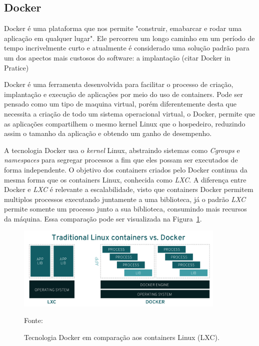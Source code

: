 \subsection{Docker}

Docker é uma plataforma que nos permite "construir, emabarcar e rodar uma aplicação em qualquer lugar". Ele percorreu um longo caminho em um período de tempo incrivelmente curto e atualmente é considerado uma solução padrão para um dos apectos mais custosos do software: a implantação (citar Docker in Pratice)

Docker é uma ferramenta desenvolvida para facilitar o processo de criação, implantação e execução de aplicações por meio do uso de containers.
%
Pode ser pensado como um tipo de maquina virtual, porém diferentemente desta que necessita a criação de todo um sistema operacional virtual, o Docker, permite que as aplicações compartilhem o mesmo kernel Linux que o hospedeiro, reduzindo assim o tamanho da aplicação e obtendo um ganho de desempenho.


A tecnologia Docker usa o \textit{kernel} Linux, abstraindo sistemas como \textit{Cgroups} e \textit{namespaces} para segregar processos a fim que eles possam ser executados de forma independente.
%
O objetivo dos containers criados pelo Docker continua da mesma forma que  os containers Linux, conhecida como \textit{LXC}.
%
A diferença entre Docker e \textit{LXC} é relevante a escalabilidade, visto que containers Docker permitem multiplos processos executando juntamente a uma biblioteca, já o padrão \textit{LXC} permite somente um processo junto a sua biblioteca, consumindo mais recursos da máquina.
%
Essa comparação pode ser visualizada na Figura~\ref{fig:container_docker}.

\begin{figure}[htb!]
\caption{Tecnologia Docker em comparação aos containers Linux (LXC).}
\label{fig:container_docker}
\includegraphics[height=4cm]{img/cap2/traditional-linux-containers-vs-docker_0.png}
\centering

Fonte:~\cite{container}
\end{figure}



